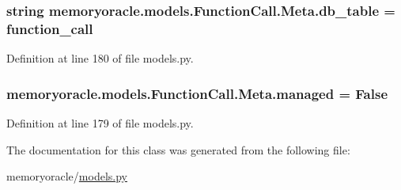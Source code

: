 \subsubsection[{db\+\_\+table}]{\setlength{\rightskip}{0pt plus 5cm}string memoryoracle.\+models.\+Function\+Call.\+Meta.\+db\+\_\+table = \textquotesingle{}function\+\_\+call\textquotesingle{}\hspace{0.3cm}{\ttfamily [static]}}\label{classmemoryoracle_1_1models_1_1FunctionCall_1_1Meta_a21ce6fc41da9bb3e3459bc8f3a3155a9}


Definition at line 180 of file models.\+py.

\hypertarget{classmemoryoracle_1_1models_1_1FunctionCall_1_1Meta_a91bdd1050fa16ecafa081a12b5520e53}{}
\subsubsection[{managed}]{\setlength{\rightskip}{0pt plus 5cm}memoryoracle.\+models.\+Function\+Call.\+Meta.\+managed = False\hspace{0.3cm}{\ttfamily [static]}}\label{classmemoryoracle_1_1models_1_1FunctionCall_1_1Meta_a91bdd1050fa16ecafa081a12b5520e53}


Definition at line 179 of file models.\+py.



The documentation for this class was generated from the following file\+:\begin{DoxyCompactItemize}
\item 
memoryoracle/\hyperlink{models_8py}{models.\+py}\end{DoxyCompactItemize}
